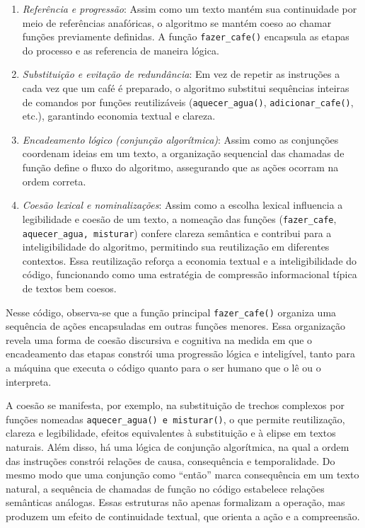 \documentclass[portuguese]{textolivre}
\begin{document}
\begin{enumerate}
    \item \emph{Referência e progressão}: Assim como um texto mantém sua continuidade por meio de referências anafóricas, o algoritmo se mantém coeso ao chamar funções previamente definidas. A função  \lstinline[language=Python]{fazer_cafe()} encapsula as etapas do processo e as referencia de maneira lógica.
    \item \emph{Substituição e evitação de redundância}: Em vez de repetir as instruções a cada vez que um café é preparado, o algoritmo substitui sequências inteiras de comandos por funções reutilizáveis (\lstinline[language=Python]{aquecer_agua()}, \lstinline[language=Python]{adicionar_cafe()}, etc.), garantindo economia textual e clareza.
    \item \emph{Encadeamento lógico (conjunção algorítmica)}: Assim como as conjunções coordenam ideias em um texto, a organização sequencial das chamadas de função define o fluxo do algoritmo, assegurando que as ações ocorram na ordem correta.
    \item \emph{Coesão lexical e nominalizações}: Assim como a escolha lexical influencia a legibilidade e coesão de um texto, a nomeação das funções (\lstinline[language=Python]{fazer_cafe}, \lstinline[language=Python]{aquecer_agua, misturar}) confere clareza semântica e contribui para a inteligibilidade do algoritmo, permitindo sua reutilização em diferentes contextos. Essa reutilização reforça a economia textual e a inteligibilidade do código, funcionando como uma estratégia de compressão informacional típica de textos bem coesos.
\end{enumerate}

Nesse código, observa-se que a função principal \lstinline[language=Python]{fazer_cafe()} organiza uma sequência de ações encapsuladas em outras funções menores. Essa organização revela uma forma de coesão discursiva e cognitiva na medida em que o encadeamento das etapas constrói uma progressão lógica e inteligível, tanto para a máquina que executa o código quanto para o ser humano que o lê ou o interpreta.

A coesão se manifesta, por exemplo, na substituição de trechos complexos por funções nomeadas \lstinline[language=Python]{aquecer_agua() e misturar()}, o que permite reutilização, clareza e legibilidade, efeitos equivalentes à substituição e à elipse em textos naturais. Além disso, há uma lógica de conjunção algorítmica, na qual a ordem das instruções constrói relações de causa, consequência e temporalidade. Do mesmo modo que uma conjunção como “então” marca consequência em um texto natural, a sequência de chamadas de função no código estabelece relações semânticas análogas. Essas estruturas não apenas formalizam a operação, mas produzem um efeito de continuidade textual, que orienta a ação e a compreensão.
\end{document}
